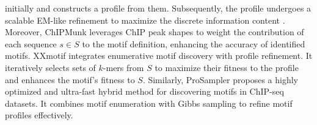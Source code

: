 \documentclass[a4paper, titlepage, openright]{book}
\begin{document}
initially and constructs a profile from them. Subsequently, the profile undergoes a scalable EM-like refinement to maximize the discrete information content \citep{kulakovskiy2009discovery}. Moreover, ChIPMunk leverages ChIP peak shapes to weight the contribution of each sequence $s \in S$ to the motif definition, enhancing the accuracy of identified motifs. XXmotif \citep{hartmann2013p} integrates enumerative motif discovery with profile refinement. It iteratively selects sets of $k$-mers from $S$ to maximize their fitness to the profile and enhances the motif's fitness to $S$. Similarly, ProSampler \citep{li2019prosampler} proposes a highly optimized and ultra-fast hybrid method for discovering motifs in ChIP-seq datasets. It combines motif enumeration with Gibbs sampling to refine motif profiles effectively.

\end{document}
